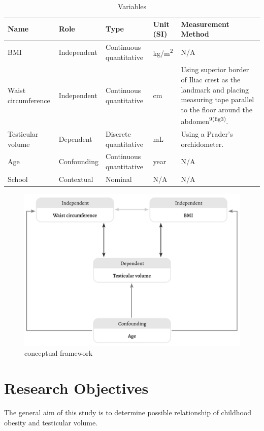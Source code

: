 \documentclass[11pt]{article}
\makeatletter
\newcommand{\citeprocitem}[2]{\hyper@linkstart{cite}{citeproc_bib_item_#1}#2\hyper@linkend}
\makeatother
\begin{document}
\begin{table}
\centering
\begin{tabular}{l|l|l|l|p{6cm}}
Name & Role & Type & Unit (SI) & Measurement Method\\
\hline
BMI & Independent & Continuous quantitative & kg/m\textsuperscript{2} & N/A\\
Waist circumference & Independent & Continuous quantitative & cm & Using superior border of Iliac crest as the landmark and placing measuring tape parallel to the floor around the abdomen\textsuperscript{\citeprocitem{9}{9(fig3)}}.\\
Testicular volume & Dependent & Discrete quantitative & mL & Using a Prader's orchidometer.\\
Age & Confounding & Continuous quantitative & year & N/A\\
School & Contextual & Nominal & N/A & N/A\\
\end{tabular}
\caption{Variables}

\end{table}

\begin{figure}[H]

\includegraphics[width=\linewidth]{./images/conceptual-framework.png}
\caption{conceptual framework}
\end{figure}

\section{Research Objectives}
\label{sec:orgf904d22}
The general aim of this study is to determine possible relationship of childhood obesity and testicular volume.
\end{document}
